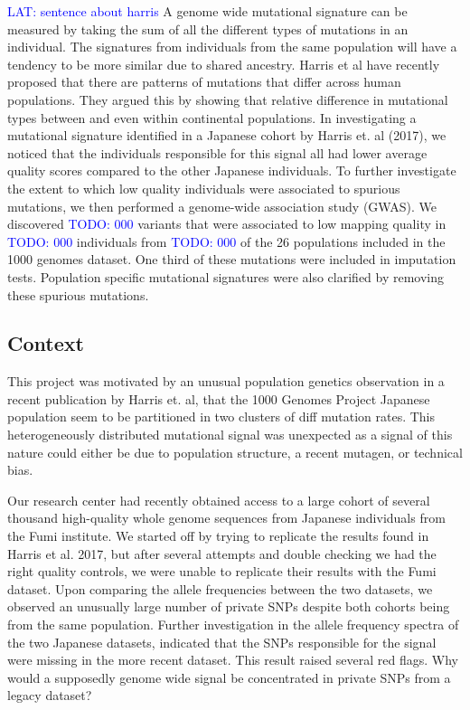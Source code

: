 \documentclass[12pt]{amsart}
\newcommand{\lat}[1]{\textcolor{blue}{LAT: #1}}
\newcommand{\todo}[1]{\textcolor{blue}{TODO: #1}}
\begin{document}
\lat{sentence about harris} 
A genome wide mutational signature can be measured by taking the sum of all the different types of mutations in an individual. 
The signatures from individuals from the same population will have a tendency to be more similar due to shared ancestry.
Harris et al have recently proposed that there are patterns of mutations that differ across human populations.
They argued this by showing that relative difference in mutational types between and even within continental populations.  
In investigating a mutational signature identified in a Japanese cohort by Harris et. al (2017), we noticed that the individuals responsible for this signal all had lower average quality scores compared to the other Japanese individuals. 
To further investigate the extent to which low quality individuals were associated to spurious mutations, we then performed a genome-wide association study (GWAS). 
We discovered \todo{000} variants that were associated to low mapping quality in \todo{000} individuals from \todo{000} of the 26 populations included in the 1000 genomes dataset. 
One third of these mutations were included in imputation tests. Population specific mutational signatures were also clarified by removing these spurious mutations.

\subsection{Context}
This project was motivated by an unusual population genetics observation in a recent publication by Harris et. al, that the 1000 Genomes Project Japanese population seem to be partitioned in two clusters of diff mutation rates. 
This heterogeneously distributed mutational signal was unexpected as a signal of this nature could either be due to population structure, a recent mutagen, or technical bias.


Our research center had recently obtained access to a large cohort of several thousand high-quality whole genome sequences from Japanese individuals from the Fumi institute. 
We started off by trying to replicate the results found in Harris et al. 2017, but after several attempts and double checking we had the right quality controls, we were unable to replicate their results with the Fumi dataset. 
Upon comparing the allele frequencies between the two datasets, we observed an unusually large number of private SNPs despite both cohorts being from the same population. 
Further investigation in the allele frequency spectra of the two Japanese datasets, indicated that the SNPs responsible for the signal were missing in the more recent dataset. 
This result raised several red flags. 
Why would a supposedly genome wide signal be concentrated in private SNPs from a legacy dataset?
\end{document}
